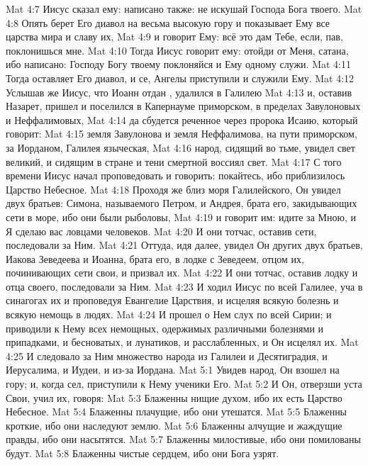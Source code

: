 \vs Mat 4:7 Иисус сказал ему: написано также: не искушай Господа Бога твоего.
\vs Mat 4:8 Опять берет Его диавол на весьма высокую гору и показывает Ему все царства мира и славу их,
\vs Mat 4:9 и говорит Ему: всё это дам Тебе, если, пав, поклонишься мне.
\vs Mat 4:10 Тогда Иисус говорит ему: отойди от Меня, сатана, ибо написано: Господу Богу твоему поклоняйся и Ему одному служи.
\vs Mat 4:11 Тогда оставляет Его диавол, и се, Ангелы приступили и служили Ему.
\rsbpar\vs Mat 4:12 Услышав же Иисус, что Иоанн отдан , удалился в Галилею
\vs Mat 4:13 и, оставив Назарет, пришел и поселился в Капернауме приморском, в пределах Завулоновых и Неффалимовых,
\vs Mat 4:14 да сбудется реченное через пророка Исаию, который говорит:
\vs Mat 4:15 земля Завулонова и земля Неффалимова, на пути приморском, за Иорданом, Галилея языческая,
\vs Mat 4:16 народ, сидящий во тьме, увидел свет великий, и сидящим в стране и тени смертной воссиял свет.
\vs Mat 4:17 С того времени Иисус начал проповедовать и говорить: покайтесь, ибо приблизилось Царство Небесное.
\rsbpar\vs Mat 4:18 Проходя же близ моря Галилейского, Он увидел двух братьев: Симона, называемого Петром, и Андрея, брата его, закидывающих сети в море, ибо они были рыболовы,
\vs Mat 4:19 и говорит им: идите за Мною, и Я сделаю вас ловцами человеков.
\vs Mat 4:20 И они тотчас, оставив сети, последовали за Ним.
\vs Mat 4:21 Оттуда, идя далее, увидел Он других двух братьев, Иакова Зеведеева и Иоанна, брата его, в лодке с Зеведеем, отцом их, починивающих сети свои, и призвал их.
\vs Mat 4:22 И они тотчас, оставив лодку и отца своего, последовали за Ним.
\rsbpar\vs Mat 4:23 И ходил Иисус по всей Галилее, уча в синагогах их и проповедуя Евангелие Царствия, и исцеляя всякую болезнь и всякую немощь в людях.
\vs Mat 4:24 И прошел о Нем слух по всей Сирии; и приводили к Нему всех немощных, одержимых различными болезнями и припадками, и бесноватых, и лунатиков, и расслабленных, и Он исцелял их.
\vs Mat 4:25 И следовало за Ним множество народа из Галилеи и Десятиградия, и Иерусалима, и Иудеи, и из-за Иордана.
\vs Mat 5:1 Увидев народ, Он взошел на гору; и, когда сел, приступили к Нему ученики Его.
\vs Mat 5:2 И Он, отверзши уста Свои, учил их, говоря:
\rsbpar\vs Mat 5:3 Блаженны нищие духом, ибо их есть Царство Небесное.
\rsbpar\vs Mat 5:4 Блаженны плачущие, ибо они утешатся.
\rsbpar\vs Mat 5:5 Блаженны кроткие, ибо они наследуют землю.
\rsbpar\vs Mat 5:6 Блаженны алчущие и жаждущие правды, ибо они насытятся.
\rsbpar\vs Mat 5:7 Блаженны милостивые, ибо они помилованы будут.
\rsbpar\vs Mat 5:8 Блаженны чистые сердцем, ибо они Бога узрят.
